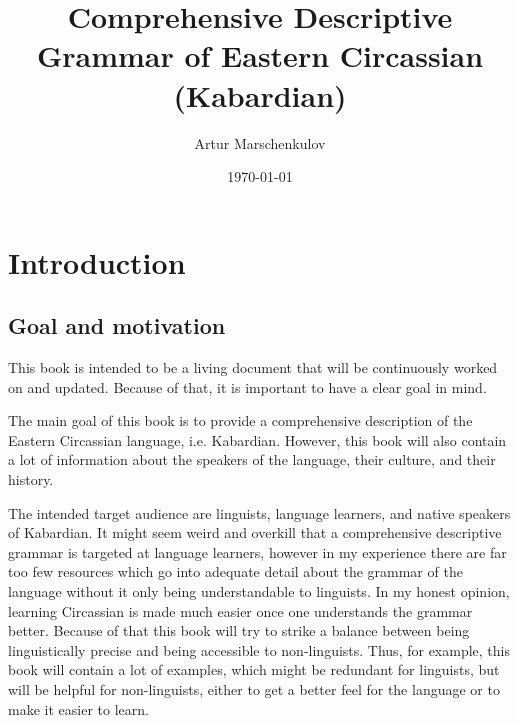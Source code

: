 \documentclass[a4paper, 10pt]{book}
\begin{document}
\title{Comprehensive Descriptive Grammar of Eastern Circassian (Kabardian)}
\author{Artur Marschenkulov}
\date{\today}


\newcommand{\mywordcre}[3]{\textbf{#1} \textit{#2} `{#3}'}
\newcommand{\mywordcr}[2]{\textbf{#1} \textit{#2}}
\newcommand{\myworde}[1]{`{#1}'}



\maketitle

\tableofcontents


\chapter{Introduction}
\section{Goal and motivation}
This book is intended to be a living document that will be continuously worked on and updated. Because of that, it is important to have a clear goal in mind.

The main goal of this book is to provide a comprehensive description of the Eastern Circassian language, i.e. Kabardian. However, this book will also contain a lot of information about the speakers of the language, their culture, and their history. 

The intended target audience are linguists, language learners, and native speakers of Kabardian. It might seem weird and overkill that a comprehensive descriptive grammar is targeted at language learners, however in my experience there are far too few resources which go into adequate detail about the grammar of the language without it only being understandable to linguists. In my honest opinion, learning Circassian is made much easier once one understands the grammar better. Because of that this book will try to strike a balance between being linguistically precise and being accessible to non-linguists. Thus, for example, this book will contain a lot of examples, which might be redundant for linguists, but will be helpful for non-linguists, either to get a better feel for the language or to make it easier to learn.
\end{document}
